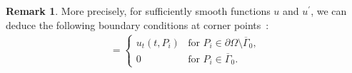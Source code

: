 \documentclass[twoside]{article}
\theoremstyle{noparens}
\theoremstyle{definition}
\newtheorem{remark}[definition]{Remark}
\numberwithin{equation}{section}
\numberwithin{figure}{section}
\begin{document}
\begin{remark}
	\label{rem4.1} \rm
	More precisely, for sufficiently smooth
	functions $u$ and $u^{\prime}$, we can deduce the following
	boundary conditions at corner points~\cite{chen2}:
	\begin{align*}
		[M_{t}(u)(t,P_{i})] =
		\begin{cases}
			u_t(t,P_{i}) & \text{for } P_{i} \in \partial\Omega \setminus \overline{\Gamma}_{0},\\[4pt]
			0 & \text{for } P_{i} \in \overline{\Gamma}_{0}.
		\end{cases}
	\end{align*}
\end{remark}

%
%
\medskip
\end{document}
